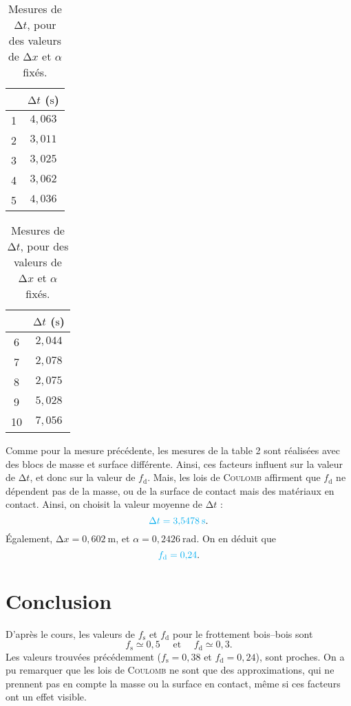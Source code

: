 \documentclass[a4paper,twocolumn,10pt]{report}
\begin{document}
	\begin{table}[H]
		\centering
		\begin{tabular}{|c|c|}
			\hline & $\mathrm{\Delta}t$ ($\mathrm{s}$)\\\hline
			1&$4{,}063$ \\\hline
			2&$3{,}011$ \\\hline
			3&$3{,}025$ \\\hline
			4&$3{,}062$ \\\hline
			5&$4{,}036$ \\\hline
		\end{tabular}
		\begin{tabular}{|c|c|}
			\hline & $\mathrm{\Delta}t$ ($\mathrm{s}$)\\\hline
			6&$2{,}044$ \\\hline
			7&$2{,}078$ \\\hline
			8&$2{,}075$ \\\hline
			9&$5{,}028$ \\\hline
			10&$7{,}056$ \\\hline
		\end{tabular}
		\caption{Mesures de $\mathrm{\Delta}t$, pour des valeurs de $\mathrm{\Delta}x$\/ et $\alpha$\/ fixés.}
	\end{table}

	Comme pour la mesure précédente, les mesures de la table 2 sont réalisées avec des blocs de masse et surface différente. Ainsi, ces facteurs influent sur la valeur de $\mathrm{\Delta}t$, et donc sur la valeur de $f_\mathrm{d}$. Mais, les lois de \textsc{Coulomb} affirment que $f_\mathrm{d}$\/ ne dépendent pas de la masse, ou de la surface de contact mais des matériaux en contact.
	Ainsi, on choisit la valeur moyenne de $\mathrm{\Delta}t$\/ : \[
		{\color{cyan} \mathrm{\Delta}t = 3{,}5478\:\mathrm{s}}
	.\]
	Également, $\mathrm{\Delta}x = 0{,}602\:\mathrm{m}$, et $\alpha = 0{,}2426\:\mathrm{rad}$. On en déduit que \[
		{\color{cyan} f_\mathrm{d} = 0{,}24}
	.\]

	\section{Conclusion}

	D'après le cours, les valeurs de $f_\mathrm{s}$\/ et $f_\mathrm{d}$\/ pour le frottement bois--bois sont \[
		f_\mathrm{s} \simeq 0{,}5 \quad\text{ et }\quad f_\mathrm{d} \simeq 0{,}3
	.\] Les valeurs trouvées précédemment ($f_\mathrm{s} = 0{,}38$\/ et $f_\mathrm{d} = 0{,}24$), sont proches.
	On a pu remarquer que les lois de \textsc{Coulomb} ne sont que des approximations, qui ne prennent pas en compte la masse ou la surface en contact, même si ces facteurs ont un effet visible.

	\sign

	~
\end{document}
